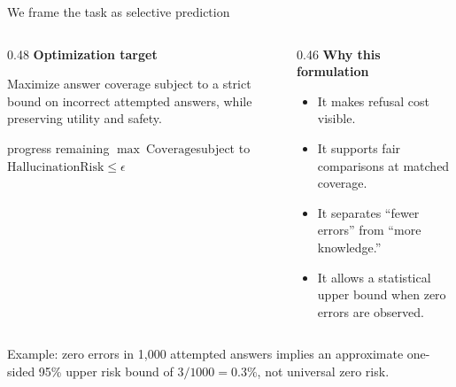 \documentclass[aspectratio=169,11pt]{beamer}
\begin{document}
\begin{frame}{We frame the task as selective prediction}
  \small
  \begin{columns}[T,onlytextwidth]
    \begin{column}{0.48\textwidth}
      \textbf{Optimization target}\par\vspace{0.18cm}
      Maximize answer coverage subject to a strict bound on incorrect attempted answers, while preserving utility and safety.\par\vspace{0.45cm}
      \begin{beamercolorbox}[rounded=true,sep=0.45em]{progress remaining}
        \centering
        $\max\ \mathrm{Coverage}$\quad subject to\quad
        $\mathrm{HallucinationRisk}\leq\epsilon$
      \end{beamercolorbox}
    \end{column}
    \begin{column}{0.46\textwidth}
      \textbf{Why this formulation}\par\vspace{0.18cm}
      \begin{itemize}\setlength\itemsep{0.12cm}
        \item It makes refusal cost visible.
        \item It supports fair comparisons at matched coverage.
        \item It separates ``fewer errors'' from ``more knowledge.''
        \item It allows a statistical upper bound when zero errors are observed.
      \end{itemize}
    \end{column}
  \end{columns}
  \vspace{0.3cm}
  {\footnotesize\color{Muted}Example: zero errors in 1,000 attempted answers implies an approximate one-sided 95\% upper risk bound of $3/1000=0.3\%$, not universal zero risk.}
\end{frame}
\end{document}

